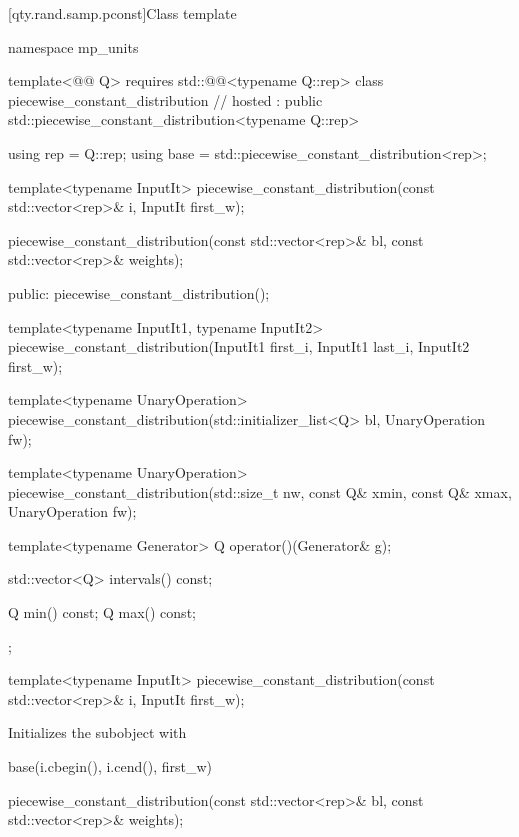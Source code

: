 [qty.rand.samp.pconst]{Class template }

\begin{codeblock}
namespace mp_units {
template<@@ Q>
  requires std::@@<typename Q::rep>
class piecewise_constant_distribution                                                   // hosted
    : public std::piecewise_constant_distribution<typename Q::rep> {
  using rep = Q::rep;
  using base = std::piecewise_constant_distribution<rep>;

  template<typename InputIt>
  piecewise_constant_distribution(const std::vector<rep>& i, InputIt first_w);

  piecewise_constant_distribution(const std::vector<rep>& bl, const std::vector<rep>& weights);

public:
  piecewise_constant_distribution();

  template<typename InputIt1, typename InputIt2>
  piecewise_constant_distribution(InputIt1 first_i, InputIt1 last_i, InputIt2 first_w);

  template<typename UnaryOperation>
  piecewise_constant_distribution(std::initializer_list<Q> bl, UnaryOperation fw);

  template<typename UnaryOperation>
  piecewise_constant_distribution(std::size_t nw, const Q& xmin, const Q& xmax,
                                  UnaryOperation fw);

  template<typename Generator>
  Q operator()(Generator& g);

  std::vector<Q> intervals() const;

  Q min() const;
  Q max() const;
};
}
\end{codeblock}

\begin{itemdecl}
template<typename InputIt>
piecewise_constant_distribution(const std::vector<rep>& i, InputIt first_w);
\end{itemdecl}

\begin{itemdescr}
\pnum
\effects
Initializes the  subobject with
\begin{codeblock}
base(i.cbegin(), i.cend(), first_w)
\end{codeblock}
\end{itemdescr}

\begin{itemdecl}
piecewise_constant_distribution(const std::vector<rep>& bl, const std::vector<rep>& weights);
\end{itemdecl}

